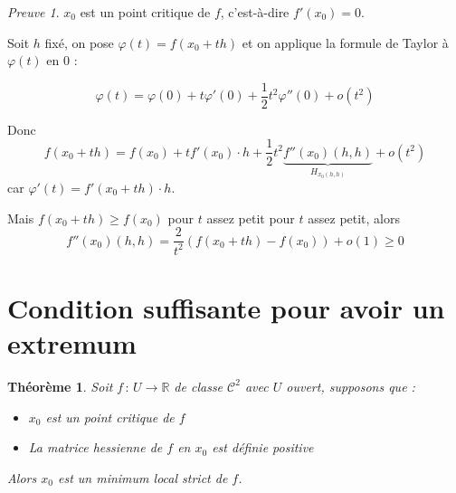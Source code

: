 \documentclass[]{article}
\newtheorem{mythm}{Théorème}
\theoremstyle{remark}
\newtheorem{myproof}{Preuve}
\theoremstyle{definition}
\newcommand{\funcshort}[3]{
#1 \, : \, #2 \longrightarrow #3
}
\begin{document}
\begin{myproof}
	$x_0$ est un point critique de $f$, c'est-à-dire $f'(x_0) = 0$.
	
	Soit $h$ fixé, on pose $\varphi(t) = f(x_0 + th)$ et on applique la formule de Taylor à $\varphi(t)$ en 0 :
	
	$$\varphi(t) = \varphi(0) + t \varphi'(0) + \frac{1}{2} t^2 \varphi''(0) + o(t^2)$$
	
	Donc $$f(x_0 + th) = f(x_0) + t f'(x_0) \cdot h + \frac{1}{2} t^2 \underbrace{f''(x_0)(h, h)}_{H_{x_0 (h, h)}} + o(t^2)$$ car $\varphi'(t) = f'(x_0 + th) \cdot
	h$.
	
	Mais $f(x_0+th) \geqslant f(x_0)$ pour $t$ assez petit pour $t$ assez petit, alors $$f''(x_0)(h, h) = \frac{2}{t^2}(f(x_0+th) - f(x_0)) + o(1) \geqslant 0$$
\end{myproof}

\section{Condition suffisante pour avoir un extremum}

\begin{mythm}
	Soit $\funcshort{f}{U}{\mathbb{R}}$ de classe $\mathcal{C}^2$ avec $U$ ouvert, supposons que :
	\begin{itemize}
		\item $x_0$ est un point critique de $f$
		\item La matrice hessienne de $f$ en $x_0$ est définie positive
	\end{itemize}
	Alors $x_0$ est un minimum local strict de $f$.
\end{mythm}
\end{document}
